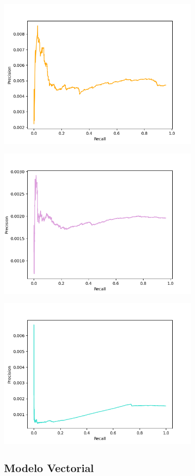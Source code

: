 \documentclass{llncs}
\begin{document}
	
	\begin{center}
		\includegraphics[width=10cm]{cranfield_boolean}
		
		\includegraphics[width=10cm]{vaswani_boolean}
		
		\includegraphics[width=10cm]{cord19_boolean}
	\end{center}
	
	\subsection{Modelo Vectorial}
\end{document}
